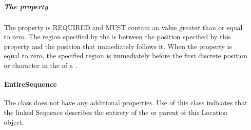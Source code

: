 \subparagraph{The  property}
\label{sec:at}
The  property is REQUIRED and MUST contain an  value greater than or equal to zero. The region specified by the  is between the position specified by this property and the position that immediately follows it. When the  property is equal to zero, the specified region is immediately before the first discrete position or character in the   of a .


\paragraph{EntireSequence}
\label{sec:EntireSequence}
The  class does not have any additional properties. Use of this class indicates that the linked Sequence describes the entirety of the  or  parent of this Location object.


